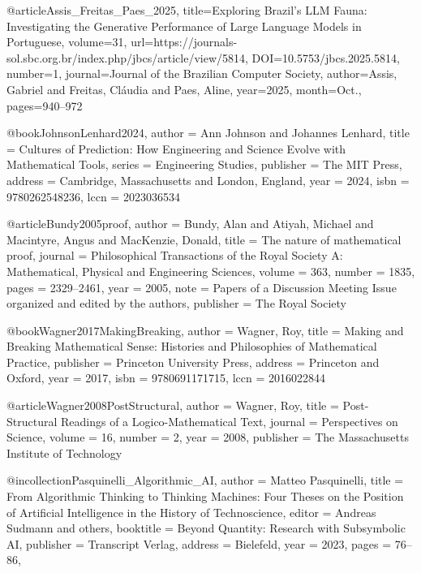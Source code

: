 @article{Assis_Freitas_Paes_2025,
    title={Exploring Brazil’s LLM Fauna: Investigating the Generative Performance of Large Language Models in Portuguese},
    volume={31},
    url={https://journals-sol.sbc.org.br/index.php/jbcs/article/view/5814},
    DOI={10.5753/jbcs.2025.5814},
    number={1},
    journal={Journal of the Brazilian Computer Society},
    author={Assis, Gabriel and Freitas, Cláudia and Paes, Aline},
    year={2025},
    month={Oct.},
    pages={940–972}
}

@book{JohnsonLenhard2024,
  author = {Ann Johnson and Johannes Lenhard},
  title = {Cultures of Prediction: How Engineering and Science Evolve with Mathematical Tools},
  series = {Engineering Studies},
  publisher = {The MIT Press},
  address = {Cambridge, Massachusetts and London, England},
  year = {2024},
  isbn = {9780262548236}, %
  lccn = {2023036534} %
}

@article{Bundy2005proof,
  author  = {Bundy, Alan and Atiyah, Michael and Macintyre, Angus and MacKenzie, Donald},
  title   = {The nature of mathematical proof},
  journal = {Philosophical Transactions of the Royal Society A: Mathematical, Physical and Engineering Sciences},
  volume  = {363},
  number  = {1835},
  pages   = {2329--2461},
  year    = {2005},
  note    = {Papers of a Discussion Meeting Issue organized and edited by the authors},
  publisher = {The Royal Society}
}

@book{Wagner2017MakingBreaking,
  author = {Wagner, Roy},
  title = {Making and Breaking Mathematical Sense: Histories and Philosophies of Mathematical Practice},
  publisher = {Princeton University Press},
  address = {Princeton and Oxford},
  year = {2017},
  isbn = {9780691171715},
  lccn = {2016022844}
}

@article{Wagner2008PostStructural,
  author = {Wagner, Roy},
  title = {Post-Structural Readings of a Logico-Mathematical Text},
  journal = {Perspectives on Science},
  volume = {16},
  number = {2},
  year = {2008},
  publisher = {The Massachusetts Institute of Technology}
}

@incollection{Pasquinelli_Algorithmic_AI,
  author    = {Matteo Pasquinelli},
  title     = {From Algorithmic Thinking to Thinking Machines: Four Theses on the Position of Artificial Intelligence in the History of Technoscience},
  editor    = {Andreas Sudmann and others}, %
  booktitle = {Beyond Quantity: Research with Subsymbolic AI},
  publisher = {Transcript Verlag},
  address   = {Bielefeld},
  year      = {2023},
  pages     = {76--86},
}

